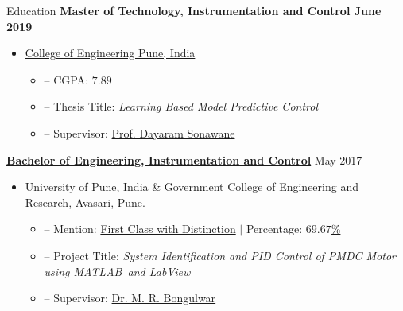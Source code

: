 \documentclass[11pt]{resume}
\newcommand{\mt}{\textsc{MATLAB}}
\newenvironment{outerlist}[1][\enskip\textbullet]%
{\begin{itemize}[#1,leftmargin=*]}{\end{itemize}%
	\vspace{-.5\baselineskip}}
\newenvironment{innerlist}[1][\enskip\textbullet]%
{\begin{itemize}[#1,leftmargin=*,parsep=0pt,itemsep=0pt,topsep=0pt,partopsep=0pt]}
	{\end{itemize}}
\begin{document}
\begin{rSection}{Education}
{\bf{Master of Technology, Instrumentation and Control} \hfill June 2019}
\begin{outerlist}
	\item  \href{http://www.coep.org.in/} {College of Engineering Pune, India}
	\begin{innerlist}
		\item[--] CGPA: $ 7.89 $
		\item[--] Thesis Title: \textit{Learning Based Model Predictive Control}
		\item[--] Supervisor: \href{http://www.coep.org.in/mycoep/dnsinstrucoepacin} {Prof. Dayaram Sonawane}
	\end{innerlist}
\end{outerlist}
\vspace{.1in}
\textbf{\href{https://saketadhau.netlify.com/data/be-degree.pdf} {Bachelor of Engineering, Instrumentation and Control}} \hfill May 2017
\begin{outerlist}
	\item  \href{http://www.unipune.ac.in/} {University of Pune, India}	\& \href{http://www.gcoeara.ac.in/} {Government College of Engineering and Research, Avasari, Pune.}
	\begin{innerlist}
		\item[--] Mention: \href{https://saketadhau.netlify.com/data/be-marks.pdf} {First Class with Distinction} $ \vert $ Percentage: \href{https://saketadhau.netlify.com/data/be-marks.pdf} {$69.67$\%}
		\item[--] Project Title: \textit{System Identification and PID Control of PMDC Motor using \mt~and LabView}
		\item[--] Supervisor: \href{http://www.gcoeara.ac.in/Instrumentation-control-about-us.php} {Dr. M. R. Bongulwar}
	\end{innerlist}
\end{outerlist}
\end{rSection}
\vspace{.05in}
\end{document}

